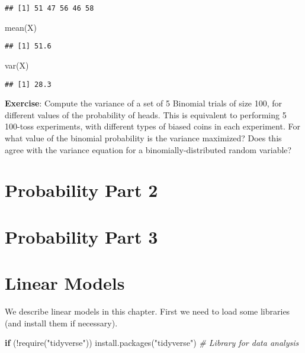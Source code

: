 \documentclass[
]{book}
\newenvironment{Shaded}{\begin{snugshade}}{\end{snugshade}}
\newcommand{\CommentTok}[1]{\textcolor[rgb]{0.56,0.35,0.01}{\textit{#1}}}
\newcommand{\ControlFlowTok}[1]{\textcolor[rgb]{0.13,0.29,0.53}{\textbf{#1}}}
\newcommand{\FunctionTok}[1]{\textcolor[rgb]{0.00,0.00,0.00}{#1}}
\newcommand{\NormalTok}[1]{#1}
\newcommand{\SpecialCharTok}[1]{\textcolor[rgb]{0.00,0.00,0.00}{#1}}
\newcommand{\StringTok}[1]{\textcolor[rgb]{0.31,0.60,0.02}{#1}}
\begin{document}
\begin{verbatim}
## [1] 51 47 56 46 58
\end{verbatim}

\begin{Shaded}
\begin{Highlighting}[]
\FunctionTok{mean}\NormalTok{(X)}
\end{Highlighting}
\end{Shaded}

\begin{verbatim}
## [1] 51.6
\end{verbatim}

\begin{Shaded}
\begin{Highlighting}[]
\FunctionTok{var}\NormalTok{(X)}
\end{Highlighting}
\end{Shaded}

\begin{verbatim}
## [1] 28.3
\end{verbatim}

\textbf{Exercise}: Compute the variance of a set of 5 Binomial trials of size 100, for different values of the probability of heads. This is equivalent to performing 5 100-toss experiments, with different types of biased coins in each experiment. For what value of the binomial probability is the variance maximized? Does this agree with the variance equation for a binomially-distributed random variable?

\hypertarget{probability-part-2}{%
\chapter{Probability Part 2}\label{probability-part-2}}

\hypertarget{probability-part-3}{%
\chapter{Probability Part 3}\label{probability-part-3}}

\hypertarget{linear-models}{%
\chapter{Linear Models}\label{linear-models}}

We describe linear models in this chapter. First we need to load some libraries (and install them if necessary).

\begin{Shaded}
\begin{Highlighting}[]
\ControlFlowTok{if}\NormalTok{ (}\SpecialCharTok{!}\FunctionTok{require}\NormalTok{(}\StringTok{"tidyverse"}\NormalTok{)) }\FunctionTok{install.packages}\NormalTok{(}\StringTok{"tidyverse"}\NormalTok{) }\CommentTok{\# Library for data analysis}
\end{Highlighting}
\end{Shaded}
\end{document}
